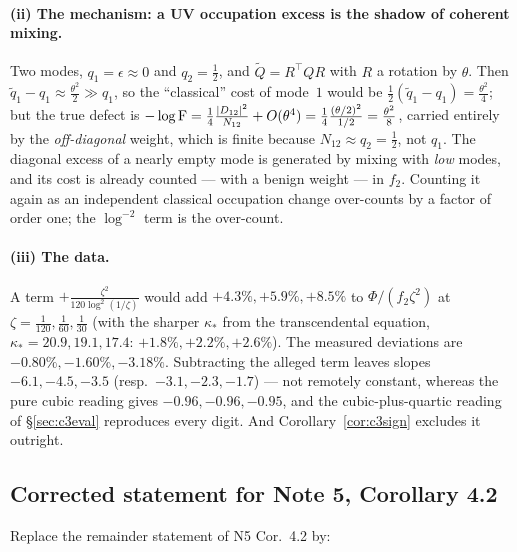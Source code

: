 \documentclass[11pt]{article}
\newcommand{\abs}[1]{\lvert#1\rvert}
\begin{document}
\paragraph{(ii) The mechanism: a UV occupation excess is the shadow of coherent mixing.}
Two modes, $q_1=\epsilon\approx0$ and $q_2=\frac12$, and $\widetilde Q=R^{\!\top}QR$ with $R$ a
rotation by $\theta$.  Then $\widetilde q_1-q_1\approx\frac{\theta^2}2\gg q_1$, so the ``classical''
cost of mode~$1$ would be $\frac12(\widetilde q_1-q_1)=\frac{\theta^2}4$; but the true defect is
$-\log\Fid=\frac14\frac{\abs{D_{12}}^2}{N_{12}}+O(\theta^4)
=\frac14\frac{(\theta/2)^2}{1/2}=\frac{\theta^2}8$, carried entirely by the \emph{off-diagonal}
weight, which is finite because $N_{12}\approx q_2=\frac12$, not $q_1$.  The diagonal excess of a
nearly empty mode is generated by mixing with \emph{low} modes, and its cost is already counted
--- with a benign weight --- in $f_2$.  Counting it again as an independent classical occupation
change over-counts by a factor of order one; the $\log^{-2}$ term is the over-count.

\paragraph{(iii) The data.}  A term $+\frac{\zeta^2}{120\log^2(1/\zeta)}$ would add
$+4.3\%,+5.9\%,+8.5\%$ to $\Phi/(f_2\zeta^2)$ at $\zeta=\frac1{120},\frac1{60},\frac1{30}$
(with the sharper $\kappa_*$ from the transcendental equation, $\kappa_*=20.9,19.1,17.4$:
$+1.8\%,+2.2\%,+2.6\%$).  The measured deviations are $-0.80\%,-1.60\%,-3.18\%$.  Subtracting the
alleged term leaves slopes $-6.1,-4.5,-3.5$ (resp.\ $-3.1,-2.3,-1.7$) --- not remotely constant,
whereas the pure cubic reading gives $-0.96,-0.96,-0.95$, and the cubic-plus-quartic reading of
\S\ref{sec:c3eval} reproduces every digit.  And Corollary~\ref{cor:c3sign} excludes it outright.

\subsection{Corrected statement for Note 5, Corollary 4.2}\label{sec:corrected}

Replace the remainder statement of N5 Cor.~4.2 by:
\end{document}
